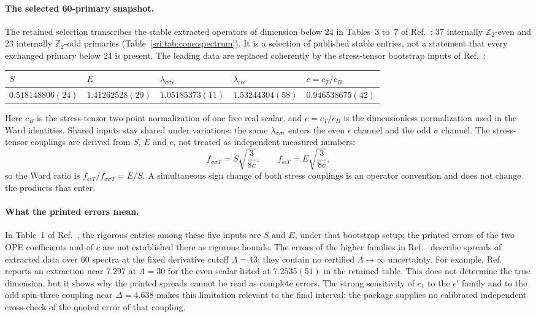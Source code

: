 \paragraph{The selected 60-primary snapshot.} The retained selection transcribes the stable extracted operators of
dimension below 24 in Tables~3 to~7 of Ref.~\cite{sri:Simmons-Duffin:2016wlq}: 37 internally $\mathbb Z_2$-even and 23
internally $\mathbb Z_2$-odd primaries (Table~\ref{sri:tab:cone:spectrum}). It is a selection of published stable entries,
not a statement that every exchanged primary below 24 is present. The leading data are replaced coherently by the
stress-tensor bootstrap inputs of Ref.~\cite{sri:Chang:2024whx}:
\begin{center}\small
\begin{tabular}{@{}lllll@{}}
\toprule
$S$ & $E$ & $\lambda_{\sigma\sigma\epsilon}$ & $\lambda_{\epsilon\epsilon\epsilon}$ & $c=c_T/c_B$\\
\midrule
$0.518148806(24)$ & $1.41262528(29)$ & $1.05185373(11)$ & $1.53244304(58)$ & $0.946538675(42)$\\
\bottomrule
\end{tabular}
\end{center}
Here $c_B$ is the stress-tensor two-point normalization of one free real scalar, and $c=c_T/c_B$ is the dimensionless
normalization used in the Ward identities. Shared inputs stay shared under variations: the same
$\lambda_{\sigma\sigma\epsilon}$ enters the even $\epsilon$ channel and the odd $\sigma$ channel. The stress-tensor
couplings are derived from $S$, $E$ and $c$, not treated as independent measured numbers:
\begin{equation}
 f_{\sigma\sigma T}=S\sqrt{\frac{3}{8c}},\qquad f_{\epsilon\epsilon T}=E\sqrt{\frac{3}{8c}},
 \label{sri:eq:cone:ward}
\end{equation}
so the Ward ratio is $f_{\epsilon\epsilon T}/f_{\sigma\sigma T}=E/S$. A simultaneous sign change of both stress
couplings is an operator convention and does not change the products that enter.

\paragraph{What the printed errors mean.} In Table~1 of Ref.~\cite{sri:Chang:2024whx}, the rigorous entries among these
five inputs are $S$ and $E$, under that bootstrap setup; the printed errors of the two OPE coefficients and of $c$ are
not established there as rigorous bounds. The errors of the higher families in Ref.~\cite{sri:Simmons-Duffin:2016wlq}
describe spreads of extracted data over 60 spectra at the fixed derivative cutoff $\Lambda=43$; they contain no
certified $\Lambda\to\infty$ uncertainty. For example, Ref.~\cite{sri:Henriksson:2022} reports an extraction near $7.297$
at $\Lambda=30$ for the even scalar listed at $7.2535(51)$ in the retained table. This does not determine the true
dimension, but it shows why the printed spreads cannot be read as complete errors. The strong sensitivity of $c_1$ to
the $\epsilon'$ family and to the odd spin-three coupling near $\Delta=4.638$ makes this limitation relevant to the
final interval; the package supplies no calibrated independent cross-check of the quoted error of that coupling.

